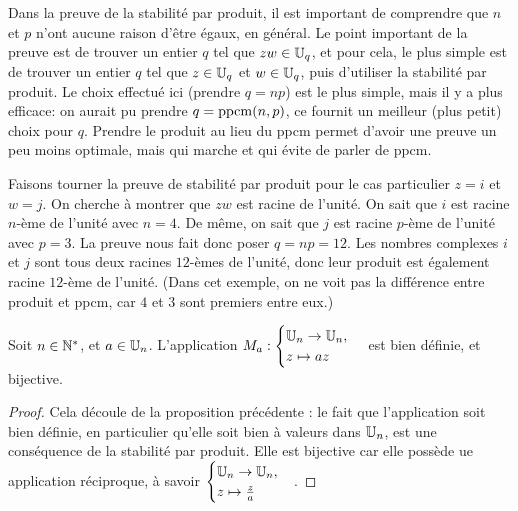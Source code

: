 \begin{remarque}
Dans la preuve de la stabilité par produit, il est important de comprendre que $n$ et $p$ n'ont aucune raison d'être égaux, en général. Le point important de la preuve est de trouver un entier $q$ tel que $zw \in \mathbb{U}_q$, et pour cela, le plus simple est de trouver un entier $q$ tel que $z\in \mathbb{U}_q$ et $w\in \mathbb{U}_q$, puis d'utiliser la stabilité par produit. Le choix effectué ici (prendre $q=np$) est le plus simple, mais il y a plus \og efficace\fg : on aurait pu prendre $q=\operatorname{ppcm}(n,p)$, ce fournit un meilleur (plus petit) choix pour $q$. Prendre le produit au lieu du ppcm permet d'avoir une preuve un peu moins optimale, mais qui marche et qui évite de parler de ppcm.
\end{remarque}

\begin{remarque}
Faisons \og tourner\fg{} la preuve de stabilité par produit pour le cas particulier $z=i$ et $w=j$. On cherche à montrer que $zw$ est racine de l'unité. On sait que $i$ est racine $n$-ème de l'unité avec $n=4$. De même, on sait que $j$ est racine $p$-ème de l'unité avec $p=3$. La preuve nous fait donc poser $q=np=12$. Les nombres complexes $i$ et $j$ sont tous deux racines $12$-èmes de l'unité, donc leur produit est également racine $12$-ème de l'unité. (Dans cet exemple, on ne voit pas la différence entre produit et ppcm, car $4$ et $3$ sont premiers entre eux.)
\end{remarque}


\begin{proposition}
Soit $n\in\mathbb{N}^*$, et $a\in\mathbb{U}_n$. L'application $M_a : \begin{cases} \mathbb{U}_n\to \mathbb{U}_n,\\z\mapsto az\end{cases}$ est bien définie, et bijective.
\end{proposition}
\begin{proof}
Cela découle de la proposition précédente : le fait que l'application soit bien définie, en particulier qu'elle soit bien à valeurs dans $\mathbb{U}_n$, est une conséquence de la stabilité par produit. Elle est bijective car elle possède ue application réciproque, à savoir $\begin{cases} \mathbb{U}_n\to \mathbb{U}_n,\\z\mapsto \frac{z}{a}\end{cases}$.
\end{proof}

